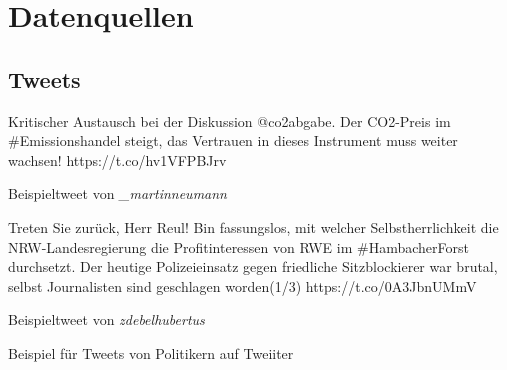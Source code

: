 
\addchap{\langanhang}


\pagebreak

\setcounter{section}{0}
\renewcommand{\thesection}{\Alph{section}}


\section{Datenquellen} \label{ch:dataAppendix}

\subsection*{Tweets}

\begin{code}[H]
    \begin{subcode}{0.45\textwidth}
        \small
        Kritischer Austausch bei der Diskussion @co2abgabe. Der CO2-Preis im \#Emissionshandel steigt, das Vertrauen in dieses Instrument muss weiter wachsen! https://t.co/hv1VFPBJrv
        \caption{Beispieltweet von \textit{\_martinneumann}}
    \end{subcode}\hfill
    \begin{subcode}{0.45\textwidth}
        \small
        Treten Sie zurück, Herr Reul! Bin fassungslos, mit welcher Selbstherrlichkeit die NRW-Landesregierung die Profitinteressen von RWE im \#HambacherForst durchsetzt. Der heutige Polizeieinsatz gegen friedliche Sitzblockierer war brutal, selbst Journalisten sind geschlagen worden(1/3) https://t.co/0A3JbnUMmV
        \caption{Beispieltweet von \textit{zdebelhubertus}}
    \end{subcode}\hfill
    \caption[Beispiel -- Tweets]{Beispiel für Tweets von Politikern auf Tweiiter} \label{list:exampleTweets}
\end{code}

